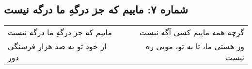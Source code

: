 \begin{center}
\section*{شماره ۷: ماییم که جز درگهِ ما درگه نیست}
\label{sec:007}
\begin{longtable}{l p{0.5cm} r}
ماییم که جز درگهِ ما درگه نیست
&&
گرچه همه ماییم کسی آگه نیست
\\
از خود تو به صد هزار فرسنگی دور
&&
وز هستی ما، تا به تو، مویی ره نیست
\\
\end{longtable}
\end{center}
